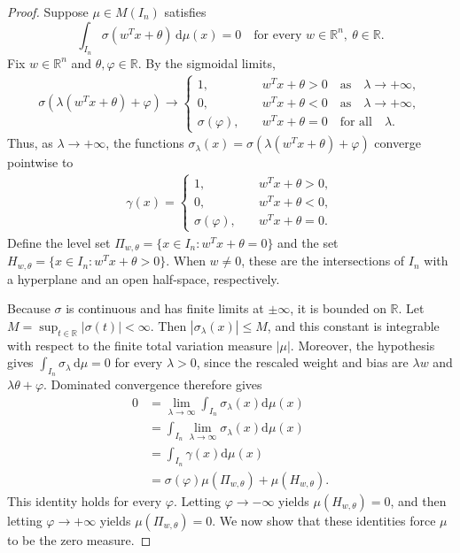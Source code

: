 \documentclass[12pt]{article}
\begin{document}
\begin{proof}
    Suppose $\mu\in M(I_n)$ satisfies
\[
\int_{I_n}\sigma(w^Tx+\theta)\,\mathrm{d}\mu(x)=0
\quad\text{for every }w\in\mathbb{R}^n,\ \theta\in\mathbb{R}.
\]
Fix $w\in\mathbb{R}^n$ and $\theta,\varphi\in\mathbb{R}$. By the sigmoidal limits,
\begin{align*}
    \sigma(\lambda (w^T x + \theta) + \varphi) \rightarrow 
\begin{cases}
1, &  \quad w^T x + \theta > 0 \quad \text{as} \quad \lambda \to +\infty, \\
0, &  \quad w^T x + \theta < 0 \quad \text{as} \quad \lambda \to +\infty, \\
\sigma(\varphi), & \quad w^T x + \theta = 0 \quad \text{for all} \quad \lambda.
\end{cases}
\end{align*}
Thus, as $\lambda \to +\infty$, the functions $\sigma_\lambda(x)=\sigma(\lambda (w^T x + \theta) + \varphi)$ converge pointwise to
\begin{align*}
    \gamma(x) =
\begin{cases}
1, & \quad w^T x + \theta > 0, \\
0, & \quad w^T x + \theta < 0, \\
\sigma(\varphi), & \quad w^T x + \theta = 0.
\end{cases}
\end{align*}
Define the level set $\Pi_{w,\theta} = \{x \in I_n : w^T x + \theta = 0\}$ and the set $H_{w,\theta} = \{x \in I_n : w^T x + \theta > 0\}$. When $w\neq0$, these are the intersections of $I_n$ with a hyperplane and an open half-space, respectively.

Because $\sigma$ is continuous and has finite limits at $\pm\infty$, it is bounded on $\mathbb{R}$. Let $M=\sup_{t\in\mathbb{R}}|\sigma(t)|<\infty$. Then $|\sigma_\lambda(x)|\leq M$, and this constant is integrable with respect to the finite total variation measure $|\mu|$. Moreover, the hypothesis gives $\int_{I_n}\sigma_\lambda\,\mathrm{d}\mu=0$ for every $\lambda>0$, since the rescaled weight and bias are $\lambda w$ and $\lambda\theta+\varphi$. Dominated convergence therefore gives
\begin{align*}
    0&=\lim_{\lambda\to \infty} \int_{I_n} \sigma_\lambda(x)\mathrm{d}\mu(x)\\
    &= \int_{I_n} \lim_{\lambda\to \infty} \sigma_\lambda(x)\mathrm{d}\mu(x)\\
    &=\int_{I_n} \gamma(x) \mathrm{d}\mu(x)\\
    &=\sigma(\varphi)\mu(\Pi_{w,\theta})+\mu(H_{w,\theta}).
\end{align*}
This identity holds for every $\varphi$. Letting $\varphi\to-\infty$ yields $\mu(H_{w,\theta})=0$, and then letting $\varphi\to+\infty$ yields $\mu(\Pi_{w,\theta})=0$. We now show that these identities force $\mu$ to be the zero measure.


\end{proof}
\end{document}
